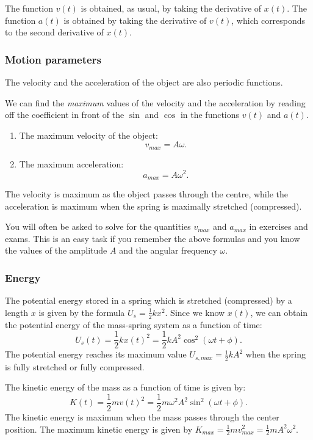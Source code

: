 \documentclass[letterpaper,9pt,journal]{IEEEtran}
\newcommand{\dokuitalic}[1]{\textsl{#1}}
\newcommand{\dokuitem}{\item}
\begin{document}
The function $v(t)$ is obtained, as usual, by taking the derivative of $x(t)$.
The function $a(t)$ is obtained by taking the derivative of $v(t)$, 
which corresponds to the second derivative of $x(t)$.


\subsubsection{Motion parameters}

The velocity and the acceleration of the object are also periodic functions.

We can find the \dokuitalic{maximum} values of the velocity and the acceleration
by reading off the coefficient in front of the $\sin$ and $\cos$
in the functions $v(t)$ and $a(t)$.


\begin{enumerate}\dokuitem  The maximum velocity of the object: \[
      v_{max} =  A \omega.
    \]
\dokuitem  The maximum acceleration: \[
     a_{max} = A \omega^2.
    \]
\end{enumerate}
The velocity is maximum as the object passes through the centre, 
while the acceleration is maximum when the spring is maximally stretched (compressed).

You will often be asked to solve for the quantities $v_{max}$ and $a_{max}$ in exercises and exams.
This is an easy task if you remember the above formulas and you know the values of the amplitude $A$ and 
the angular frequency $\omega$.


\subsubsection{Energy}

The potential energy stored in a spring which is stretched (compressed) by 
a length $x$ is given by the formula $U_s=\frac{1}{2}k x^2$.
Since we know $x(t)$, we can obtain the potential energy of the mass-spring
system as a function of time:
\[
 U_s(t)= \frac{1}{2} kx(t)^2 =\frac{1}{2}kA^2\cos^2(\omega t +\phi).
\]
The potential energy reaches its maximum value $U_{s,max}=\frac{1}{2}kA^2$
when the spring is fully stretched or fully compressed.

The kinetic energy of the mass as a function of time is given by:
\[
 K(t)= \frac{1}{2} mv(t)^2 = \frac {1}{2}m\omega^2A^2\sin^2(\omega t +\phi).
\]
The kinetic energy is maximum when the mass passes through the center position.
The maximum kinetic energy is given by 
$K_{max} = \frac{1}{2} mv_{max}^2= \frac{1}{2}mA^2\omega^2$.
\end{document}
